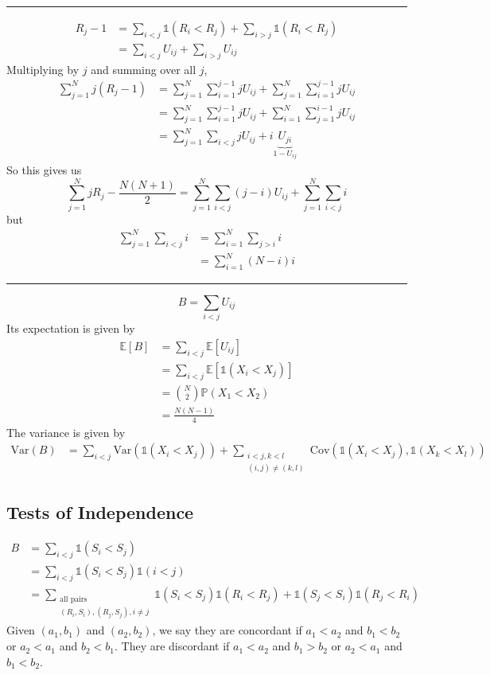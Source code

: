 \documentclass[a4paper,12pt]{amsart}
\newcommand{\sumiN}{\sum_{i=1}^N}
\newcommand{\sumjN}{\sum_{j=1}^N}
\newcommand{\Var}{\mbox{Var}}
\newcommand{\Cov}{\mbox{Cov}}
\newcommand{\E}[1]{\mathbb{E}\left[#1\right]}
\newcommand{\p}[1]{\mathbb{P}\left(#1\right)}
\begin{document}
\bigskip
\hrule
\bigskip

\begin{align*}
R_j - 1&= \sum_{i < j} \mathds{1}(R_i < R_j) + \sum_{i > j} \mathds{1}(R_i < R_j)\\
&= \sum_{i < j} U_{ij} + \sum_{i > j} U_{ij}
\end{align*}
Multiplying by $j$ and summing over all $j$, 
\begin{align*}
\sumjN j(R_j-1) &= \sumjN \sum_{i=1}^{j-1} j U_{ij} + \sumjN \sum_{i=1}^{j-1} jU_{ij}\\
&= \sumjN \sum_{i=1}^{j-1} j U_{ij} + \sumiN \sum_{j=1}^{i-1} j U_{ij}\\
&= \sumjN \sum_{i < j} j U_{ij} + i \underbrace{U_{ji}}_{1 - U_{ij}}
\end{align*}
So this gives us
\[\sumjN j R_j - \frac{N(N+1)}{2} = \sumjN \sum_{i < j} (j-i)U_{ij} + \sum_{j=1}^N \sum_{i < j} i\]
but
\begin{align*}
\sum_{j=1}^N \sum_{i < j} i &= \sumiN \sum_{j > i} i\\
&= \sumiN (N-i)i
\end{align*}

\bigskip
\hrule
\bigskip

\[B = \sum_{i < j} U_{ij}\]
Its expectation is given by
\begin{align*}
\E{B} &= \sum_{i < j} \E{U_{ij}}\\
&= \sum_{i < j} \E{\mathds{1}(X_i < X_j)}\\
&= {N \choose 2} \p{X_1 < X_2}\\
&= \frac{N(N-1)}{4}
\end{align*}
The variance is given by
\begin{align*}
\Var(B) &= \sum_{i < j} \Var(\mathds{1}(X_i < X_j)) + \sum_{\substack{i<j,k<l\\(i,j) \neq (k,l)}} \Cov(\mathds{1}(X_i<X_j),\mathds{1}(X_k<X_l))
\end{align*}


\subsection{Tests of Independence}
\begin{align*}
B &= \sum_{i < j} \mathds{1}(S_i < S_j) \\
&= \sum_{i  <j} \mathds{1}(S_i < S_j) \mathds{1}(i<j)\\
&= \sum_{\substack{\text{all pairs}\\(R_i,S_i),(R_j,S_j), i \neq j}} 
\mathds{1}(S_i < S_j) \mathds{1}(R_i < R_j) + \mathds{1}(S_j < S_i) \mathds{1}(R_j < R_i)
\end{align*}
Given $(a_1,b_1)$ and $(a_2,b_2)$, we say they are concordant if $a_1<a_2$ and $b_1<b_2$ or $a_2<a_1$ and $b_2<b_1$. They are discordant if $a_1<a_2$ and $b_1 > b_2$ or $a_2 < a_1$ and $b_1 < b_2$. 
\end{document}
